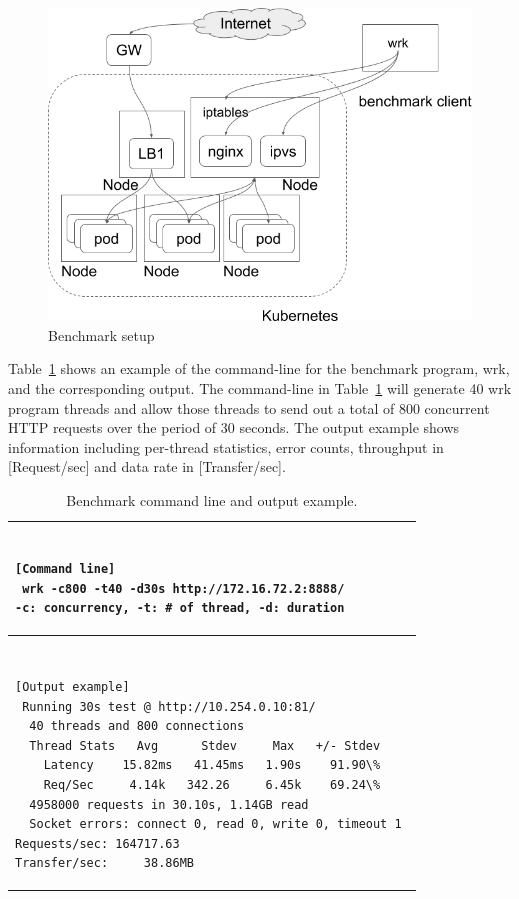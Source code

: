 \begin{figure}[h]
  \centering
  \includegraphics[width=0.9\columnwidth]{Figs/benchmark-schem}
  \caption[Benchmark setup]{Benchmark setup}
  \label{fig:benchmark-schem}
\end{figure}

Table~\ref{fig:benchmark-schem} shows an example of the command-line for the benchmark program, wrk, and the corresponding output.
The command-line in Table~\ref{tab:bench_example} will generate 40 wrk program threads
and allow those threads to send out a total of 800 concurrent HTTP requests over the period of 30 seconds.
The output example shows information including per-thread statistics, error counts, throughput in [Request/sec] and data rate in [Transfer/sec].

\begin{table}[h]
  \centering
  \begin{tabular}{l}
    \hline
    \begin{minipage}{0.8\columnwidth}
      \begin{verbatim}

[Command line] 
 wrk -c800 -t40 -d30s http://172.16.72.2:8888/ 
-c: concurrency, -t: # of thread, -d: duration 
      \end{verbatim}
    \end{minipage}
    \\ \hline

    \\ \hline
    \begin{minipage}{0.8\columnwidth}
      \begin{verbatim}

[Output example] 
 Running 30s test @ http://10.254.0.10:81/ 
  40 threads and 800 connections 
  Thread Stats   Avg      Stdev     Max   +/- Stdev 
    Latency    15.82ms   41.45ms   1.90s    91.90\% 
    Req/Sec     4.14k   342.26     6.45k    69.24\% 
  4958000 requests in 30.10s, 1.14GB read 
  Socket errors: connect 0, read 0, write 0, timeout 1 
Requests/sec: 164717.63 
Transfer/sec:     38.86MB 
      \end{verbatim}
    \end{minipage}
    \\ \hline
  \end{tabular}
  \caption[Benchmark command line and output example]{Benchmark command line and output example.}
  \label{tab:bench_example}
\end{table}

